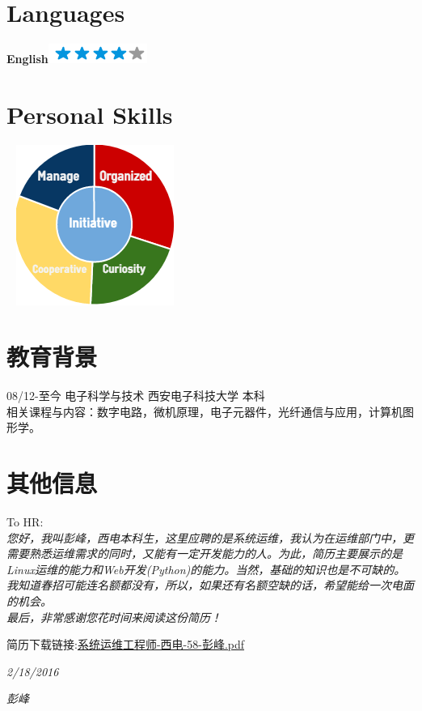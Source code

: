 \documentclass[]{friggeri-cv}
\begin{document}
\newpage


\begin{aside}
~
~
  \section{Languages}
    \textbf{English}\includegraphics[scale=0.40]{img/4stars.png}
  ~    
    \section{Personal Skills}
    ~
    \includegraphics[scale=0.72]{img/personal.png}
    ~
\end{aside}




\section{教育背景}
08/12\hspace{1mm}-\hspace{1mm}至今 \hspace{30mm} 电子科学与技术 \hspace{7mm}  西安电子科技大学  \hspace{7mm}  本科 \\

相关课程与内容：数字电路，微机原理，电子元器件，光纤通信与应用，计算机图形学。\\


\section{其他信息}
To HR:\\
\emph{您好，我叫彭峰，西电本科生，这里应聘的是系统运维，我认为在运维部门中，更需要熟悉运维需求的同时，又能有一定开发能力的人。为此，简历主要展示的是Linux运维的能力和Web开发(Python)的能力。当然，基础的知识也是不可缺的。
我知道春招可能连名额都没有，所以，如果还有名额空缺的话，希望能给一次电面的机会。\\
最后，非常感谢您花时间来阅读这份简历！\\
}

{简历下载链接:\href{http://fengidea.qiniudn.com/系统运维工程师-西电-58-彭峰.pdf}{系统运维工程师-西电-58-彭峰.pdf}}
~
~
\begin{flushleft}
\emph{2/18/2016}
\end{flushleft}
\begin{flushright}
\emph{彭峰}
\end{flushright}
\end{document}
